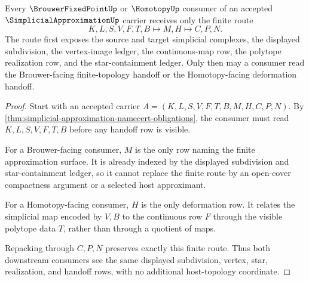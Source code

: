 \begin{theorem}
\label{thm:simplicial-approximation-brouwer-handoff}
Every $\BrouwerFixedPointUp$ or $\HomotopyUp$ consumer of an accepted $\SimplicialApproximationUp$ carrier receives only the finite route
$$
K,L,S,V,F,T,B \longmapsto M,H \longmapsto C,P,N .
$$
The route first exposes the source and target simplicial complexes, the displayed subdivision, the vertex-image ledger, the continuous-map row, the polytope realization row, and the star-containment ledger. Only then may a consumer read the Brouwer-facing finite-topology handoff or the Homotopy-facing deformation handoff.
\end{theorem}
\begin{proof}
Start with an accepted carrier $A=(K,L,S,V,F,T,B,M,H,C,P,N)$. By \autoref{thm:simplicial-approximation-namecert-obligations}, the consumer must read $K,L,S,V,F,T,B$ before any handoff row is visible.

For a Brouwer-facing consumer, $M$ is the only row naming the finite approximation surface. It is already indexed by the displayed subdivision and star-containment ledger, so it cannot replace the finite route by an open-cover compactness argument or a selected host approximant.

For a Homotopy-facing consumer, $H$ is the only deformation row. It relates the simplicial map encoded by $V,B$ to the continuous row $F$ through the visible polytope data $T$, rather than through a quotient of maps.

Repacking through $C,P,N$ preserves exactly this finite route. Thus both downstream consumers see the same displayed subdivision, vertex, star, realization, and handoff rows, with no additional host-topology coordinate.
\end{proof}



